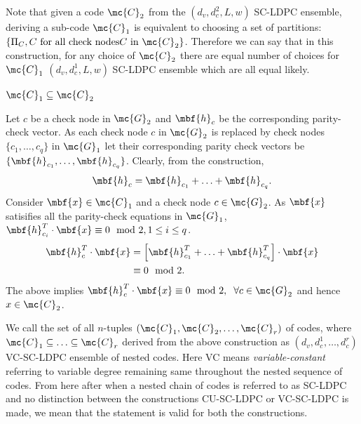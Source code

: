 \documentclass[journal]{IEEEtran}
\begin{document}
\begin{Remark}\label{Rmk:EquivNestedConstr2}
Note that given a code $\mc{C}_{2}$ from the $(d_{v},d_{c}^{2},L,w)$ SC-LDPC ensemble, deriving a sub-code $\mc{C}_{1}$ is equivalent to choosing a set of partitions: $\{\Pi_{C},C \text{ for all check nodes} C \text{ in } \mc{C}_{2}\}$. Therefore we can say that in this construction, for any choice of $\mc{C}_{2}$ there are equal number of choices for $\mc{C}_{1}$ $(d_{v},d_{c}^{1},L,w)$ SC-LDPC ensemble which are all equal likely.
\end{Remark}

\begin{lemma}\label{Lemma:NestedCodes}
$ \mc{C}_{1} \subseteq \mc{C}_{2}$
\end{lemma}
\begin{IEEEproof}
Let $c$ be a check node in $\mc{G}_{2}$ and $\mbf{h}_{c}$ be the  corresponding parity-check vector. As each check node $c$ in $\mc{G}_{2}$ is replaced by check nodes $\{c_{1},\ldots , c_{q}\}$ in $\mc{G}_{1}$ let their corresponding parity check vectors be $\{\mbf{h}_{c_{1}},\ldots , \mbf{h}_{c_{q}}\}$. Clearly, from the construction,
\begin{align*}
\mbf{h}_{c}=\mbf{h}_{c_{1}}+\ldots +\mbf{h}_{c_{q}}.
\end{align*}
Consider $\mbf{x}\in\mc{C}_{1}$ and a check node $c\in \mc{G}_{2}$. As $\mbf{x}$ satisifies all the parity-check equations in $\mc{G}_{1}$, $\mbf{h}^{T}_{c_{i}}\cdot \mbf{x}\equiv 0 \mod 2, 1\leq i \leq q$.
\begin{align*}
\mbf{h}^{T}_{c}\cdot \mbf{x}&=\left[\mbf{h}^{T}_{c_{1}}+\ldots +\mbf{h}^{T}_{c_{q}}\right] \cdot \mbf{x}\\
												&\equiv 0 \mod 2. 
\end{align*}
The above implies $\mbf{h}^{T}_{c}\cdot \mbf{x}\equiv 0 \mod 2, \hspace{0.2cm} \forall c\in \mc{G}_{2}$ and hence $x\in \mc{C}_{2}$.
\end{IEEEproof}
We call the set of all $n$-tuples $(\mc{C}_{1},\mc{C}_{2},\ldots,\mc{C}_{r})$ of codes, where $\mc{C}_{1}\subseteq \ldots\subseteq\mc{C}_{r}$ derived from the above construction as $(d_{v},d_{c}^{1},\ldots,d_{c}^{r})$ VC-SC-LDPC ensemble of nested codes. Here VC means \textit{variable-constant} referring to variable degree remaining same throughout the nested sequence of codes. From here after when a nested chain of codes is referred to as SC-LDPC and no distinction between the constructions CU-SC-LDPC or VC-SC-LDPC is made, we mean that the statement is valid for both the constructions.\\
\end{document}
